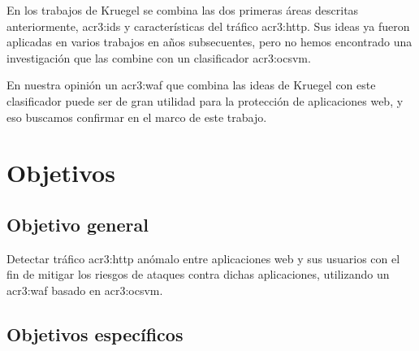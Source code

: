 En los trabajos de Kruegel se combina las dos primeras áreas descritas
anteriormente, \gls{acr3:ids} y características del tráfico \gls{acr3:http}.
Sus ideas ya fueron aplicadas en varios trabajos en años subsecuentes,
pero no hemos encontrado una investigación que las combine con un
clasificador \gls{acr3:ocsvm}.

En nuestra opinión un \gls{acr3:waf} que combina las ideas de Kruegel
con este clasificador puede ser de gran utilidad para la protección de
aplicaciones web, y eso buscamos confirmar en el marco de este trabajo.


\section{Objetivos}

\subsection{Objetivo general}

Detectar tráfico \gls{acr3:http} anómalo entre aplicaciones web
y sus usuarios con el fin de mitigar los riesgos de ataques contra
dichas aplicaciones, utilizando un \gls{acr3:waf} basado en \gls{acr3:ocsvm}.


\subsection{Objetivos específicos}

